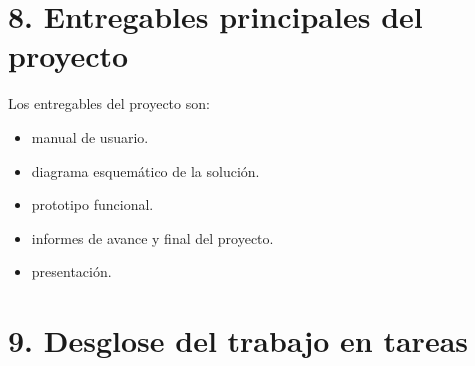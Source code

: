 \documentclass[
11pt, %
codirector, %
]{charter}
\begin{document}
\section{8. Entregables principales del proyecto}
\label{sec:entregables}

Los entregables del proyecto son:

\begin{itemize}
	\item manual de usuario.
	\item diagrama esquemático de la solución.
	\item prototipo funcional.
	\item informes de avance y final del proyecto.
	\item presentación.
\end{itemize}

\section{9. Desglose del trabajo en tareas}
\label{sec:wbs}
\end{document}
